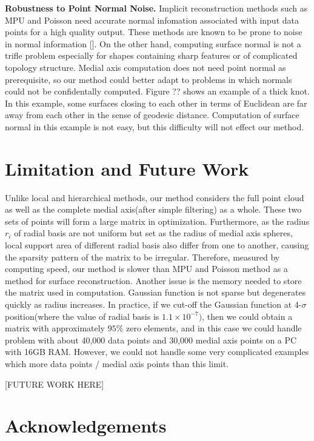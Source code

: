 \documentclass[annual]{acmsiggraph}
\begin{document}
\textbf{Robustness to Point Normal Noise. }
Implicit reconstruction methods such as MPU and Poisson need accurate normal infomation associated with input data points for a high quality output. These methods are known to be prone to noise in normal information []. On the other hand, computing surface normal is not a trifle problem especially for shapes containing sharp features or of complicated topology structure. Medial axis computation does not need point normal as prerequisite, so our method could better adapt to problems in which normals could not be confidentally computed. Figure ?? shows an example of a thick knot. In this example, some surfaces closing to each other in terms of Euclidean are far away from each other in the sense of geodesic distance. Computation of surface normal in this example is not easy, but this difficulty will not effect our method.

\section{Limitation and Future Work}
Unlike local and hierarchical methods, our method considers the full point cloud as well as the complete medial axis(after simple filtering) as a whole. These two sets of points will form a large matrix in optimization. Furthermore, as the radius $r_i$ of radial basis are not uniform but set as the radius of medial axis spheres, local support area of different radial basis also differ from one to another, causing the sparsity pattern of the matrix to be irregular. Therefore, measured by computing speed, our method is slower than MPU and Poisson method as a method for surface reconstruction. Another issue is the memory needed to store the matrix used in computation. Gaussian function is not sparse but degenerates quickly as radius increases. In practice, if we cut-off the Gaussian function at 4-$\sigma$ position(where the value of radial basis is $1.1\times 10^{-7})$, then we could obtain a matrix with approximately $95\%$ zero elements, and in this case we could handle problem with about 40,000 data points and 30,000 medial axis points on a PC with 16GB RAM. However, we could not handle some very complicated examples which more data points / medial axis points than this limit. 

[FUTURE WORK HERE]

\section*{Acknowledgements}
\end{document}
